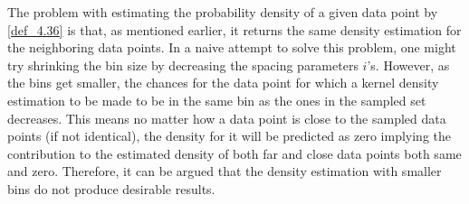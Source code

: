 The problem with estimating the probability density of a given data point by \ref{def_4.36} is that, as mentioned earlier, it returns the same density estimation for the neighboring data points. In a naive attempt to solve this problem, one might try shrinking the bin size by decreasing the spacing parameters $i$'s. However, as the bins get smaller, the chances for the data point for which a kernel density estimation to be made to be in the same bin as the ones in the sampled set decreases. This means no matter how a data point is close to the sampled data points (if not identical), the density for it will be predicted as zero implying the contribution to the estimated density of both far and close data points both same and zero. Therefore, it can be argued that the density estimation with smaller bins do not produce desirable results.

